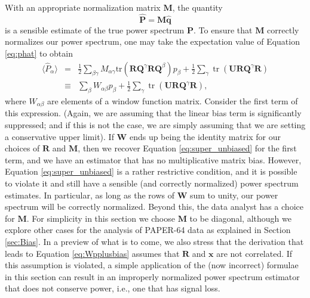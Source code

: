 \documentclass[preprint2,numberedappendix,tighten]{aastex6}  %
\DeclareMathOperator{\Tr}{tr}
\begin{document}
With an appropriate normalization matrix $\textbf{M}$, the quantity
\begin{equation}
\label{eq:phat}
\widehat{\textbf{P}} = \textbf{M}\widehat{\textbf{q}}
\end{equation}
is a sensible estimate of the true power spectrum $\textbf{P}$. To ensure that $\textbf{M}$ correctly normalizes our power spectrum, one may take the expectation value of Equation \eqref{eq:phat} to obtain
\begin{eqnarray}
\langle \widehat{P}_\alpha \rangle &=& \frac{1}{2} \sum_{\beta \gamma} M_{\alpha \gamma}  \textrm{tr} \left( \textbf{R}\textbf{Q}^{\gamma}\textbf{R} \textbf{Q}^{\beta}\right) p_\beta +\frac{1}{2} \sum_{ \gamma}  \Tr\left( \mathbf{U} \textbf{R} \textbf{Q}^{\gamma} \mathbf{R} \right) \nonumber \\
&\equiv & \sum_{\beta} W_{\alpha \beta} p_\beta +\frac{1}{2} \sum_{ \gamma}  \Tr\left( \mathbf{U} \textbf{R} \textbf{Q}^{\gamma} \mathbf{R} \right), \label{eq:Wpplusbias}
\end{eqnarray}
where $W_{\alpha \beta}$ are elements of a window function matrix. Consider the first term of this expression. (Again, we are assuming that the linear bias term is significantly suppressed; and if this is not the case, we are simply assuming that we are setting a conservative upper limit). If $\mathbf{W}$ ends up being the identity matrix for our choices of $\mathbf{R}$ and $\mathbf{M}$, then we recover Equation \eqref{eq:super_unbiased} for the first term, and we have an estimator that has no multiplicative matrix bias. However, Equation \eqref{eq:super_unbiased} is a rather restrictive condition, and it is possible to violate it and still have a sensible (and correctly normalized) power spectrum estimates. In particular, as long as the rows of $\mathbf{W}$ sum to unity, our power spectrum will be correctly normalized. Beyond this, the data analyst has a choice for $
\textbf{M}$. For simplicity in this section we choose $\textbf{M}$ to be diagonal, although we explore other cases for the analysis 
of PAPER-64 data as explained in Section \ref{sec:Bias}. In a preview of what is to come, we also stress that the derivation that leads to Equation \eqref{eq:Wpplusbias} assumes that $\mathbf{R}$ and $\mathbf{x}$ are not correlated. If this assumption is violated, a simple application of the (now incorrect) formulae in this section can result in an improperly normalized power spectrum estimator that does not conserve power, i.e., one that has signal loss.
\end{document}
